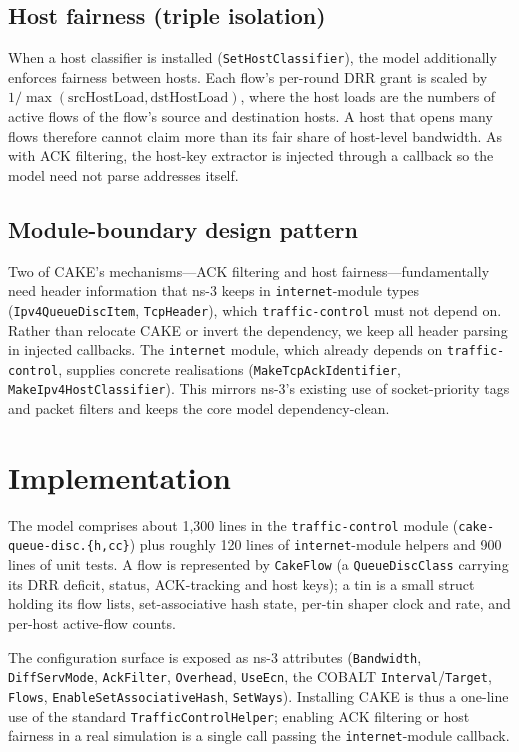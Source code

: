 \documentclass[sigconf,nonacm]{acmart}
\begin{document}
\subsection{Host fairness (triple isolation)}
When a host classifier is installed (\texttt{SetHostClassifier}), the model
additionally enforces fairness between hosts. Each flow's per-round DRR grant is
scaled by $1/\max(\text{srcHostLoad}, \text{dstHostLoad})$, where the host loads
are the numbers of active flows of the flow's source and destination hosts.
A host that opens many flows therefore cannot claim more than its fair share of
host-level bandwidth. As with ACK filtering, the host-key extractor is injected
through a callback so the model need not parse addresses itself.

\subsection{Module-boundary design pattern}
Two of CAKE's mechanisms---ACK filtering and host fairness---fundamentally need
header information that ns-3 keeps in \texttt{internet}-module types
(\texttt{Ipv4QueueDiscItem}, \texttt{TcpHeader}), which \texttt{traffic-control}
must not depend on. Rather than relocate CAKE or invert the dependency, we keep
all header parsing in injected callbacks. The \texttt{internet} module, which
already depends on \texttt{traffic-control}, supplies concrete realisations
(\texttt{MakeTcpAckIdentifier}, \texttt{MakeIpv4HostClassifier}). This mirrors
ns-3's existing use of socket-priority tags and packet filters and keeps the
core model dependency-clean.

\section{Implementation}
\label{sec:impl}

The model comprises about 1{,}300 lines in the \texttt{traffic-control} module
(\texttt{cake-queue-disc.\{h,cc\}}) plus roughly 120 lines of
\texttt{internet}-module helpers and 900 lines of unit tests. A flow
is represented by \texttt{CakeFlow} (a \texttt{QueueDiscClass} carrying its DRR
deficit, status, ACK-tracking and host keys); a tin is a small struct holding
its flow lists, set-associative hash state, per-tin shaper clock and rate, and
per-host active-flow counts.

The configuration surface is exposed as ns-3 attributes (\texttt{Bandwidth},
\texttt{DiffServMode}, \texttt{AckFilter}, \texttt{Overhead}, \texttt{UseEcn},
the COBALT \texttt{Interval}/\texttt{Target}, \texttt{Flows},
\texttt{EnableSetAssociativeHash}, \texttt{SetWays}). Installing CAKE is thus a
one-line use of the standard \texttt{TrafficControlHelper}; enabling ACK
filtering or host fairness in a real simulation is a single call passing the
\texttt{internet}-module callback.
\end{document}
